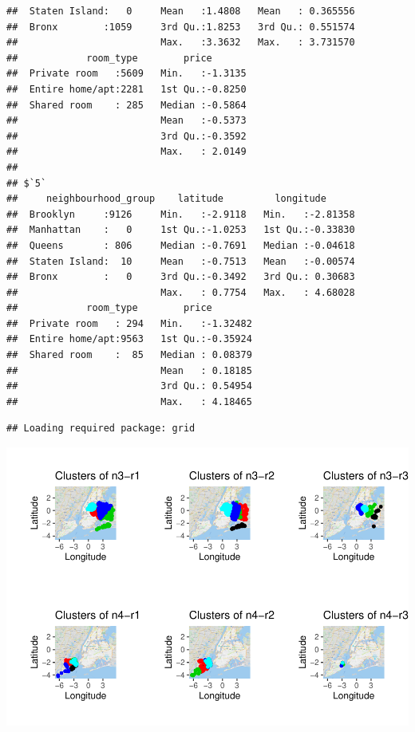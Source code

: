 \documentclass[
]{article}
\newenvironment{Shaded}{\begin{snugshade}}{\end{snugshade}}
\newcommand{\DataTypeTok}[1]{\textcolor[rgb]{0.13,0.29,0.53}{#1}}
\newcommand{\DecValTok}[1]{\textcolor[rgb]{0.00,0.00,0.81}{#1}}
\newcommand{\KeywordTok}[1]{\textcolor[rgb]{0.13,0.29,0.53}{\textbf{#1}}}
\newcommand{\NormalTok}[1]{#1}
\newcommand{\OperatorTok}[1]{\textcolor[rgb]{0.81,0.36,0.00}{\textbf{#1}}}
\begin{document}
\begin{verbatim}
##  Staten Island:   0     Mean   :1.4808   Mean   : 0.365556  
##  Bronx        :1059     3rd Qu.:1.8253   3rd Qu.: 0.551574  
##                         Max.   :3.3632   Max.   : 3.731570  
##            room_type        price        
##  Private room   :5609   Min.   :-1.3135  
##  Entire home/apt:2281   1st Qu.:-0.8250  
##  Shared room    : 285   Median :-0.5864  
##                         Mean   :-0.5373  
##                         3rd Qu.:-0.3592  
##                         Max.   : 2.0149  
## 
## $`5`
##     neighbourhood_group    latitude         longitude       
##  Brooklyn     :9126     Min.   :-2.9118   Min.   :-2.81358  
##  Manhattan    :   0     1st Qu.:-1.0253   1st Qu.:-0.33830  
##  Queens       : 806     Median :-0.7691   Median :-0.04618  
##  Staten Island:  10     Mean   :-0.7513   Mean   :-0.00574  
##  Bronx        :   0     3rd Qu.:-0.3492   3rd Qu.: 0.30683  
##                         Max.   : 0.7754   Max.   : 4.68028  
##            room_type        price         
##  Private room   : 294   Min.   :-1.32482  
##  Entire home/apt:9563   1st Qu.:-0.35924  
##  Shared room    :  85   Median : 0.08379  
##                         Mean   : 0.18185  
##                         3rd Qu.: 0.54954  
##                         Max.   : 4.18465
\end{verbatim}

\begin{Shaded}
\end{Shaded}

\begin{verbatim}
## Loading required package: grid
\end{verbatim}

\includegraphics{project-code_files/figure-latex/unnamed-chunk-22-1.pdf}
\end{document}
